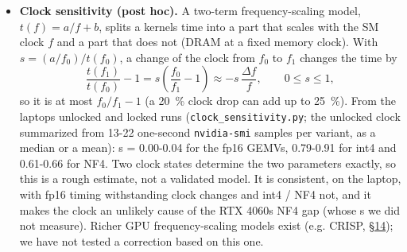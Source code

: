 \documentclass[11pt,a4paper]{article}
\providecommand{\tightlist}{\setlength{\itemsep}{0pt}\setlength{\parskip}{0pt}}
\begin{document}
\begin{itemize}
  \begin{itemize}
  \tightlist
  \item
    \textbf{RTX 4060:} the pre-registered gates and the thermal check passed, but the clock gate did not: the clock was not steady
    (2,355-2,805~MHz; power-capped in 130 of 202 busy samples). CUPTI rotation was within 0.02~\% for fp16 and 1.6~\% for int4, but 6.8-14.2~\% \emph{below} the step for
    NF4 (bitsandbytes), with similar clocks in both phases (medians 2,535 and 2,573~MHz): this kernel ran faster
    when repeated than among other kernels (cause unknown). Events in the cold loop: +0.4 to +13.5~\%.
  \item
    \textbf{A100-SXM4:} the tracing gate failed (CUPTI added 1.0-2.2~\% to the step, whose kernels took 14-138~\ensuremath{\mu}s), so
    this run is descriptive only: CUPTI rotation \ensuremath{-}4.1 to +3.7~\%, events in the cold loop +3.0 to +22.2~\%. The clock
    was power-capped (1,260-1,410~MHz).
  \item
    The RTX 4090 and H100 NVL hosts never became reachable and were destroyed unused.
  \end{itemize}
\item
  \textbf{Clock sensitivity (post hoc).} A two-term frequency-scaling model, \(t(f) = a/f + b\), splits a kernel\textquotesingle s time into
  a part that scales with the SM clock \(f\) and a part that does not (DRAM at a fixed memory clock). With
  \(s = (a/f_0)/t(f_0)\), a change of the clock from \(f_0\) to \(f_1\) changes the time by
  \[\frac{t(f_1)}{t(f_0)} - 1 = s\left(\frac{f_0}{f_1} - 1\right) \approx -s\,\frac{\Delta f}{f}, \qquad 0 \le s \le 1,\]
  so it is at most \(f_0/f_1 - 1\) (a 20~\% clock drop can add up to 25~\%). From the laptop\textquotesingle s unlocked
  and locked runs (\texttt{clock\_\allowbreak{}sensitivity.py}; the unlocked clock summarized from 13-22 one-second \texttt{nvidia-smi} samples
  per variant, as a median or a mean): s = 0.00-0.04 for the fp16 GEMVs, 0.79-0.91 for int4 and 0.61-0.66 for NF4.
  Two clock states determine the two parameters exactly, so this is a rough estimate, not a validated model. It is
  consistent, on the laptop, with fp16 timing withstanding clock changes and int4 / NF4 not, and it makes the clock
  an unlikely cause of the RTX 4060\textquotesingle s NF4 gap (whose s we did not measure). Richer GPU frequency-scaling models exist
  (e.g. CRISP, \hyperref[related-work-and-credit]{\S{}14}); we have not tested a correction based on this one.
\end{itemize}
\end{document}
